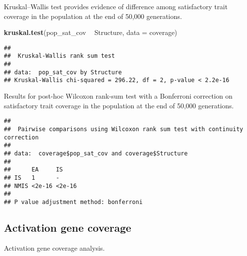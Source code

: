 \documentclass[]{book}
\newenvironment{Shaded}{\begin{snugshade}}{\end{snugshade}}
\newcommand{\DataTypeTok}[1]{\textcolor[rgb]{0.13,0.29,0.53}{#1}}
\newcommand{\KeywordTok}[1]{\textcolor[rgb]{0.13,0.29,0.53}{\textbf{#1}}}
\newcommand{\NormalTok}[1]{#1}
\newcommand{\OperatorTok}[1]{\textcolor[rgb]{0.81,0.36,0.00}{\textbf{#1}}}
\newcommand{\OtherTok}[1]{\textcolor[rgb]{0.56,0.35,0.01}{#1}}
\newcommand{\StringTok}[1]{\textcolor[rgb]{0.31,0.60,0.02}{#1}}
\begin{document}
Kruskal--Wallis test provides evidence of difference among satisfactory trait coverage in the population at the end of 50,000 generations.

\begin{Shaded}
\begin{Highlighting}[]
\KeywordTok{kruskal.test}\NormalTok{(pop_sat_cov }\OperatorTok{~}\StringTok{ }\NormalTok{Structure, }\DataTypeTok{data =}\NormalTok{ coverage)}
\end{Highlighting}
\end{Shaded}

\begin{verbatim}
## 
##  Kruskal-Wallis rank sum test
## 
## data:  pop_sat_cov by Structure
## Kruskal-Wallis chi-squared = 296.22, df = 2, p-value < 2.2e-16
\end{verbatim}

Results for post-hoc Wilcoxon rank-sum test with a Bonferroni correction on satisfactory trait coverage in the population at the end of 50,000 generations.

\begin{Shaded}
\end{Shaded}

\begin{verbatim}
## 
##  Pairwise comparisons using Wilcoxon rank sum test with continuity correction 
## 
## data:  coverage$pop_sat_cov and coverage$Structure 
## 
##      EA     IS    
## IS   1      -     
## NMIS <2e-16 <2e-16
## 
## P value adjustment method: bonferroni
\end{verbatim}

\hypertarget{activation-gene-coverage-6}{%
\subsection{Activation gene coverage}\label{activation-gene-coverage-6}}

Activation gene coverage analysis.
\end{document}
